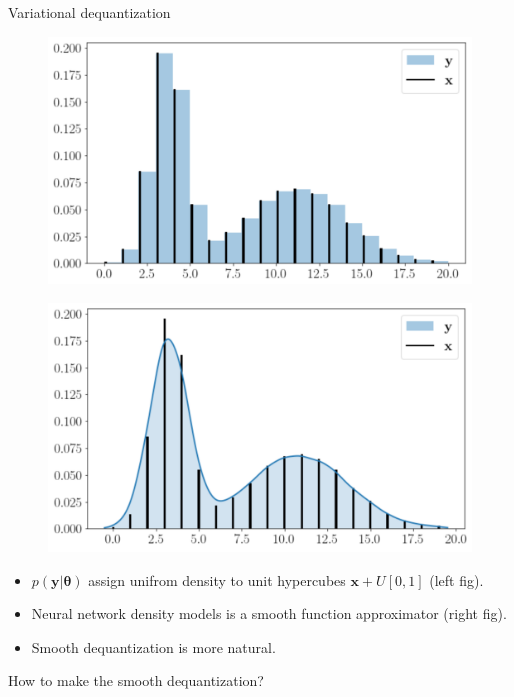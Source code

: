 \documentclass{beamer}
\newcommand{\bx}{\mathbf{x}}
\newcommand{\by}{\mathbf{y}}
\newcommand{\btheta}{\boldsymbol{\theta}}
\begin{document}
\begin{frame}{Variational dequantization}
	\begin{minipage}[t]{0.5\columnwidth}
			\begin{figure}
				\centering
				\includegraphics[width=1.0\linewidth]{figs/uniform_dequantization.png}
			\end{figure}
	\end{minipage}%
	\begin{minipage}[t]{0.5\columnwidth}
		\begin{figure}
			\centering
			\includegraphics[width=1.0\linewidth]{figs/variational_dequantization.png}
		\end{figure}
	\end{minipage}
	\begin{itemize}
		\item $p(\by | \btheta)$ assign unifrom density to unit hypercubes $\bx + U[0, 1]$ (left fig).
		\item Neural network density models is a smooth function approximator (right fig).
		\item Smooth dequantization is more natural.
	\end{itemize}
	How to make the smooth dequantization? \\
\end{frame}
\end{document}
